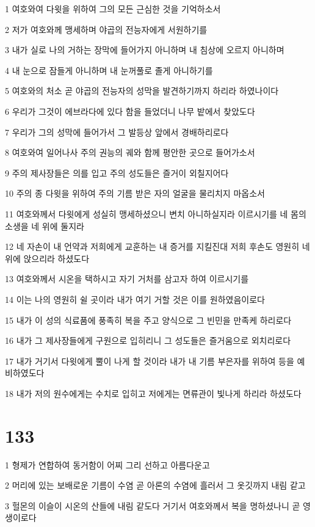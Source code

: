 \par 1 여호와여 다윗을 위하여 그의 모든 근심한 것을 기억하소서
\par 2 저가 여호와께 맹세하며 야곱의 전능자에게 서원하기를
\par 3 내가 실로 나의 거하는 장막에 들어가지 아니하며 내 침상에 오르지 아니하며
\par 4 내 눈으로 잠들게 아니하며 내 눈꺼풀로 졸게 아니하기를
\par 5 여호와의 처소 곧 야곱의 전능자의 성막을 발견하기까지 하리라 하였나이다
\par 6 우리가 그것이 에브라다에 있다 함을 들었더니 나무 밭에서 찾았도다
\par 7 우리가 그의 성막에 들어가서 그 발등상 앞에서 경배하리로다
\par 8 여호와여 일어나사 주의 권능의 궤와 함께 평안한 곳으로 들어가소서
\par 9 주의 제사장들은 의를 입고 주의 성도들은 즐거이 외칠지어다
\par 10 주의 종 다윗을 위하여 주의 기름 받은 자의 얼굴을 물리치지 마옵소서
\par 11 여호와께서 다윗에게 성실히 맹세하셨으니 변치 아니하실지라 이르시기를 네 몸의 소생을 네 위에 둘지라
\par 12 네 자손이 내 언약과 저희에게 교훈하는 내 증거를 지킬진대 저희 후손도 영원히 네 위에 앉으리라 하셨도다
\par 13 여호와께서 시온을 택하시고 자기 거처를 삼고자 하여 이르시기를
\par 14 이는 나의 영원히 쉴 곳이라 내가 여기 거할 것은 이를 원하였음이로다
\par 15 내가 이 성의 식료품에 풍족히 복을 주고 양식으로 그 빈민을 만족케 하리로다
\par 16 내가 그 제사장들에게 구원으로 입히리니 그 성도들은 즐거움으로 외치리로다
\par 17 내가 거기서 다윗에게 뿔이 나게 할 것이라 내가 내 기름 부은자를 위하여 등을 예비하였도다
\par 18 내가 저의 원수에게는 수치로 입히고 저에게는 면류관이 빛나게 하리라 하셨도다

\chapter{133}

\par 1 형제가 연합하여 동거함이 어찌 그리 선하고 아름다운고
\par 2 머리에 있는 보배로운 기름이 수염 곧 아론의 수염에 흘러서 그 옷깃까지 내림 같고
\par 3 헐몬의 이슬이 시온의 산들에 내림 같도다 거기서 여호와께서 복을 명하셨나니 곧 영생이로다

